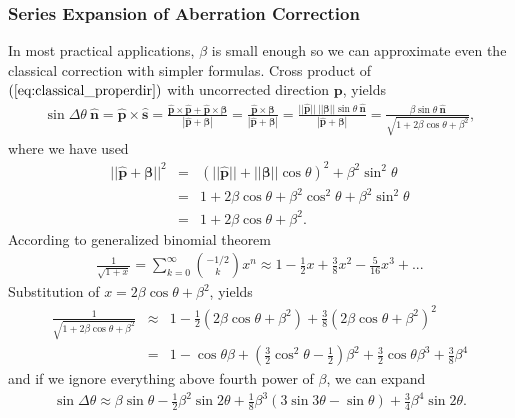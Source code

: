 \documentclass [12pt, a4paper] {article}
\newcommand{\vu}[1]
{
	\mathbf{\hat #1}
}
\newcommand{\vc}[1]
{
	\boldsymbol{#1}
}
\begin{document}
\subsubsection{Series Expansion of Aberration Correction}
In most practical applications, $\beta$ is small enough so we can approximate even the 
classical correction with simpler formulas. 
Cross product of $(\ref{eq:classical_properdir})$ with uncorrected 
direction $\vc p$, yields
\begin {eqnarray}
    \sin\Delta\theta\:\vu n
    =
    \vu p\times\vu s 
    = 
    \frac{\vu p\times\vu p + \vu p\times\vc\beta}{|\vu p + \vc\beta|}
    = 
    \frac{\vu p\times\vc\beta}{|\vu p + \vc\beta|}
    = 
    \frac{||\vu p||\:||\vc\beta||\sin\theta\:\vu n}{|\vu p + \vc\beta|}
    = 
    \frac{\beta\sin\theta\:\vu n}{\sqrt{1 + 2\beta\cos\theta + \beta^2}},
\end {eqnarray}
where we have used 
\begin {eqnarray}
    ||\vu p + \vc\beta||^2
    &=&
    (||\vu p|| + ||\vc\beta||\cos\theta)^2 + \beta^2\sin^2\theta
    \\
    &=&
    1 + 2\beta\cos\theta + \beta^2\cos^2\theta + \beta^2\sin^2\theta 
    \\
    &=&
    1 + 2\beta\cos\theta + \beta^2.
\end {eqnarray}
According to generalized binomial theorem
\begin {eqnarray}
    \frac{1}{\sqrt{1 + x}} 
    = 
    \sum_{k=0}^\infty
    \binom{-1/2}{k}x^n 
    \approx 
    1 - \frac{1}{2}x + \frac{3}{8}x^2 - \frac{5}{16}x^3 + ...
\end {eqnarray}
Substitution of $x=2\beta\cos\theta + \beta^2$, yields
\begin {eqnarray}
    \frac{1}{\sqrt{1 + 2\beta\cos\theta + \beta^2}}
    &\approx&
    1 
    -
    \frac{1}{2}(2\beta\cos\theta + \beta^2)
    +
    \frac{3}{8}(2\beta\cos\theta + \beta^2)^2
    \\
    &=&
    1 - \cos\theta\beta 
    + 
    \left(\frac{3}{2}\cos^2\theta - \frac{1}{2}\right)\beta^2
    +
    \frac{3}{2}\cos\theta\beta^3 
    +
    \frac{3}{8}\beta^4
\end {eqnarray}
and if we ignore everything above fourth power of $\beta$, we can expand 
\begin {eqnarray}
    \sin\Delta\theta 
    \approx
    \beta\sin\theta 
    -
    \frac{1}{2}\beta^2\sin 2\theta
    +
    \frac{1}{8}\beta^3(3\sin 3\theta - \sin\theta)
    + 
    \frac{3}{4}\beta^4\sin 2\theta.
\end {eqnarray}
\end{document}
